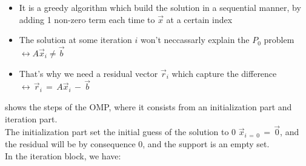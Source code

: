 \documentclass[12pt,a4paper]{book}
\begin{document}
\begin{itemize}
    \item It is a greedy algorithm which build the solution in a sequential manner, by adding 1 non-zero term each time to $\Vec{x}$ at a certain index
    
    \item The solution at some iteration $i$ won't neccassarly explain the $P_0$ problem $\leftrightarrow A \Vec{x}_i \neq \Vec{b}$
    
    
    \item That's why we need a residual vector $\Vec{r}_i$ which capture the difference $\leftrightarrow  \, \Vec{r}_i \, = \, A \Vec{x}_i \, - \, \Vec{b}$

\end{itemize}

 shows the steps of the OMP, where it consists from an initialization part and iteration part.\\
 
 The initialization part set the initial guess of the solution to 0 $\Vec{x}_{i \, = \, 0} \, = \, \Vec{0}$, and the residual will be by consequence 0, and the support is an empty set.\\
 
 In the iteration block, we have:
 
\end{document}
